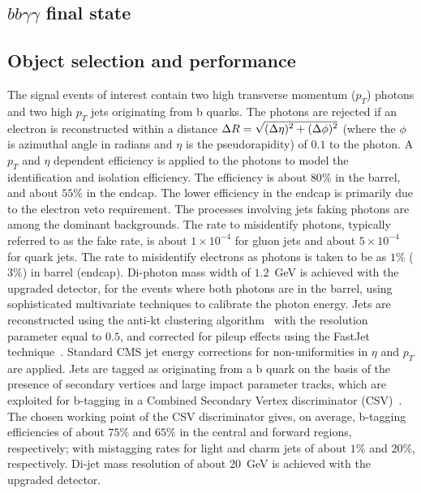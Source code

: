 \subsection{$bb\gamma\gamma$ final state}

\subsection{Object selection and performance}
\label{sec:objects}

% 
The signal events of interest contain two high transverse momentum ($p_{T}$) photons and two high $p_{T}$ jets originating from b quarks. The photons are rejected if an electron is reconstructed within a distance $\Delta R = \sqrt{\smash[b]{(\Delta\eta)^2 + (\Delta\phi)^2}}$ (where the $\phi$ is azimuthal angle in radians and $\eta$ is the pseudorapidity) of $0.1$ to the photon.  A $p_{T}$ and $\eta$ dependent efficiency is applied to the photons to model the identification and isolation efficiency. The efficiency is about $80\%$ in the barrel, and about $55\%$ in the endcap. The lower efficiency in the endcap is primarily due to the electron veto requirement. The processes involving jets faking photons are among the dominant backgrounds. The rate to misidentify photons, typically referred to as the fake rate, is about $1 \times 10^{-4}$ for gluon jets and about $5\times 10^{-4}$ for quark jets. The rate to misidentify electrons as photons is taken to be as $1\%$ ($3\%$) in barrel (endcap). Di-photon mass width of $1.2$~GeV is achieved with the upgraded detector, for the events where both photons are in the barrel, using sophisticated multivariate techniques to calibrate the photon energy.  
Jets are reconstructed using the anti-kt clustering algorithm~\cite{antikt} with the resolution parameter equal to $0.5$,
and corrected for pileup effects using the FastJet technique~\cite{CMS-PAS-JME-10-003,CMS-DP-2013-011}. Standard CMS jet energy corrections for non-uniformities in $\eta$ and $p_{T}$ are applied. Jets are tagged as originating from a b quark  on the basis of the presence of secondary vertices and large impact parameter tracks, which are exploited for b-tagging in a Combined Secondary Vertex discriminator (CSV)~\cite{CMS:BTagPaper,CMS-PAS-BTV-13-001,CMS-DP-2013-005}. The chosen working point of the CSV discriminator gives, on average, b-tagging efficiencies of about $75\%$ and $65\%$ in the central and forward regions, respectively; with mistagging rates for light and charm
jets of about $1\%$ and $20\%$, respectively. Di-jet mass resolution of about $20$~GeV is achieved with the upgraded detector. 

